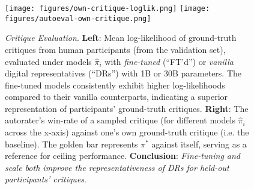 \begin{figure}[htbp]
\centerline{
\texttt{[image: figures/own-critique-loglik.png]}
\texttt{[image: figures/autoeval-own-critique.png]}
}
\caption{\textit{Critique Evaluation}.
%
\textbf{Left}: Mean log-likelihood of ground-truth critiques from human participants (from the validation set), evaluated under models $\hat{\pi}_{i}$ with \textit{fine-tuned} (``FT'd'') or \textit{vanilla} digital representatives (``DRs'') with 1B or 30B parameters. The fine-tuned models consistently exhibit higher log-likelihoods compared to their vanilla counterparts, indicating a superior representation of participants' ground-truth critiques.
%
\textbf{Right}: The autorater's win-rate of a sampled critique (for different models $\hat{\pi}_{i}$ across the x-axis) against one's own ground-truth critique (i.e. the baseline). The golden bar represents $\pi^{*}$ against itself, serving as a reference for ceiling performance.
%
\textbf{Conclusion}: \textit{Fine-tuning and scale both improve the representativeness of DRs for held-out participants' critiques}.
}
\label{fig:critique-eval}
\end{figure}




